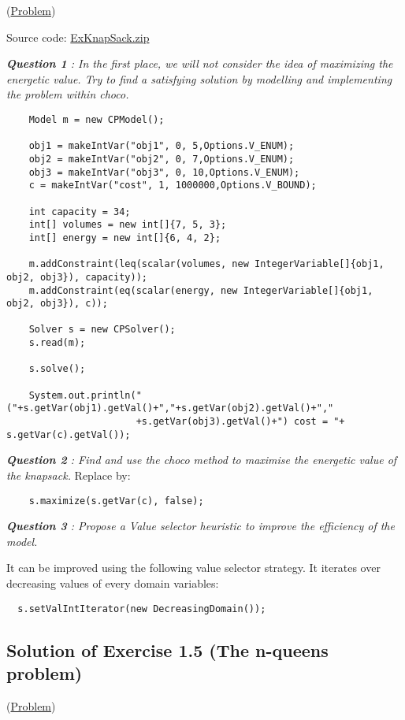 (\hyperlink{exercises:exercise1.4}{Problem})

Source code: \href{media/zip/exknapsack.zip}{ExKnapSack.zip}

\noindent\emph{\textbf{Question 1} : In the first place, we will not consider the idea of maximizing the energetic value. Try to find a satisfying solution by modelling and implementing the problem within choco.}

\begin{lstlisting}
	Model m = new CPModel();
	
	obj1 = makeIntVar("obj1", 0, 5,Options.V_ENUM);
	obj2 = makeIntVar("obj2", 0, 7,Options.V_ENUM);
	obj3 = makeIntVar("obj3", 0, 10,Options.V_ENUM);
	c = makeIntVar("cost", 1, 1000000,Options.V_BOUND);
	
	int capacity = 34;
	int[] volumes = new int[]{7, 5, 3};
	int[] energy = new int[]{6, 4, 2};
	
	m.addConstraint(leq(scalar(volumes, new IntegerVariable[]{obj1, obj2, obj3}), capacity));
	m.addConstraint(eq(scalar(energy, new IntegerVariable[]{obj1, obj2, obj3}), c));
	
	Solver s = new CPSolver();
	s.read(m);

	s.solve();
	
	System.out.println("("+s.getVar(obj1).getVal()+","+s.getVar(obj2).getVal()+","
                       +s.getVar(obj3).getVal()+") cost = "+ s.getVar(c).getVal());
\end{lstlisting}

\noindent\emph{\textbf{Question 2} : Find and use the choco method to maximise the energetic value of the knapsack.}
Replace  by:
\begin{lstlisting}
	s.maximize(s.getVar(c), false);
\end{lstlisting}

\noindent\emph{\textbf{Question 3} : Propose a Value selector heuristic to improve the efficiency of the model.}

It can be improved using the following value selector strategy. It iterates over decreasing values of every domain variables: 
\begin{lstlisting}
  s.setValIntIterator(new DecreasingDomain());
\end{lstlisting}

\subsection{Solution of Exercise 1.5 (The n-queens problem)}\label{solutions:solutionofexercise1.5}\hypertarget{solutions:solutionofexercise1.5}{}
(\hyperlink{exercises:exercise1.5}{Problem})

